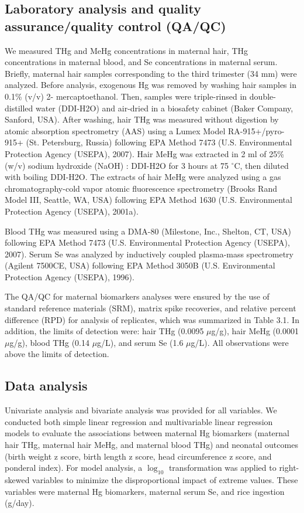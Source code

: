 \subsection{Laboratory analysis and quality assurance/quality control (QA/QC)}

We measured THg and MeHg concentrations in maternal hair, THg concentrations in maternal blood, and Se concentrations in maternal serum. Briefly, maternal hair samples corresponding to the third trimester (34 mm) were analyzed. Before analysis, exogenous Hg was removed by washing hair samples in 0.1\% (v/v) 2- mercaptoethanol. Then, samples were triple-rinsed in double-distilled water (DDI-H2O) and air-dried in a biosafety cabinet (Baker Company, Sanford, USA). After washing, hair
THg was measured without digestion by atomic absorption spectrometry (AAS) using a Lumex Model RA-915+/pyro-915+ (St. Petersburg, Russia) following EPA Method 7473 (U.S. Environmental Protection Agency (USEPA), 2007). Hair MeHg was extracted in 2 ml of 25\% (w/v) sodium hydroxide (NaOH) : DDI-H2O for 3 hours at 75 \({^\circ}\)C, then diluted with boiling DDI-H2O. The extracts of hair MeHg were analyzed using a gas chromatography-cold vapor atomic fluorescence spectrometry (Brooks Rand Model III, Seattle, WA, USA) following EPA Method 1630 (U.S. Environmental Protection Agency (USEPA), 2001a).

Blood THg was measured using a DMA-80 (Milestone, Inc., Shelton, CT, USA) following EPA Method 7473 (U.S. Environmental Protection Agency (USEPA), 2007). Serum Se was analyzed by inductively coupled plasma-mass spectrometry (Agilent 7500CE, USA) following EPA Method 3050B (U.S. Environmental Protection Agency (USEPA), 1996).

The QA/QC for maternal biomarkers analyses were ensured by the use of standard reference materials (SRM), matrix spike recoveries, and relative percent difference (RPD) for analysis of replicates, which was summarized in Table 3.1. In addition, the limits of detection were: hair THg (0.0095 ${\mu}$g/g), hair MeHg (0.0001 ${\mu}$g/g), blood THg (0.14 ${\mu}$g/L), and serum Se (1.6 ${\mu}$g/L). All observations were above the limits of detection.

\subsection{Data analysis}

Univariate analysis and bivariate analysis was provided for all variables. We conducted both simple linear regression and multivariable linear regression models to evaluate the associations between maternal Hg biomarkers (maternal hair THg, maternal hair MeHg, and maternal blood THg) and neonatal outcomes (birth weight z score, birth length z score, head circumference z score, and ponderal index). For model analysis, a $\log_{10}$ transformation was applied to right-skewed variables to minimize the disproportional impact of extreme values. These variables were maternal Hg biomarkers, maternal serum Se, and rice ingestion (g/day).

